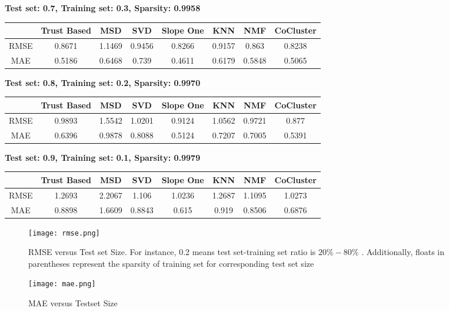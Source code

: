 	\vspace{1cm}
	\textbf{Test set: 0.7, Training set: 0.3, Sparsity: 0.9958}
	\begin{center}
	\begin{tabular}{ | c | c | c | c | c | c | c | c |}
		\hline
		& Trust Based & MSD & SVD & Slope One & KNN & NMF & CoCluster\\ 
		\hline
		RMSE&0.8671  & 1.1469  & 0.9456  & 0.8266  & 0.9157  & 0.863  & 0.8238\\
		\hline
		MAE&0.5186  & 0.6468  & 0.739  & 0.4611  & 0.6179  & 0.5848  & 0.5065\\
		\hline
	\end{tabular}
	\end{center} 
	\vspace{1cm}
	\textbf{Test set: 0.8, Training set: 0.2, Sparsity: 0.9970}
	\begin{center}
	\begin{tabular}{ | c | c | c | c | c | c | c | c |}
		\hline
		& Trust Based & MSD & SVD & Slope One & KNN & NMF & CoCluster\\ 
		\hline
		RMSE&0.9893  & 1.5542  & 1.0201  & 0.9124  & 1.0562  & 0.9721  & 0.877\\
		\hline
		MAE&0.6396  & 0.9878  & 0.8088  & 0.5124  & 0.7207  & 0.7005  & 0.5391\\
		\hline
	\end{tabular}
	\end{center} 
	\vspace{1cm}
	\textbf{Test set: 0.9, Training set: 0.1, Sparsity: 0.9979}
	\begin{center}
	\begin{tabular}{ | c | c | c | c | c | c | c | c |}
		\hline
		& Trust Based & MSD & SVD & Slope One & KNN & NMF & CoCluster\\ 
		\hline
		RMSE&1.2693  & 2.2067  & 1.106  & 1.0236  & 1.2687  & 1.1095  & 1.0273\\
		\hline
		MAE&0.8898  & 1.6609  & 0.8843  & 0.615  & 0.919  & 0.8506  & 0.6876\\
		\hline
	\end{tabular}
	\end{center} 

\begin{figure}[H]
	\centering
	\texttt{[image: rmse.png]}
	\caption{RMSE versus Test set Size. For instance, 0.2 means test set-training set ratio is $20\%-80\%$ . Additionally, floats in parentheses represent the sparsity of training set for corresponding test set size}
	\label{fig:rmse}
\end{figure}

\begin{figure}[H]
	\centering
	\texttt{[image: mae.png]}
	\caption{MAE versus Testset Size}
	\label{fig:mae}
\end{figure}